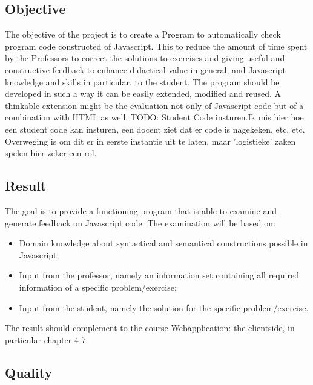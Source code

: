 \documentclass{article}
\begin{document}
\subsection{Objective}

The objective of the project is to create a Program to automatically check
program code constructed of Javascript. This to reduce the amount of time spent
by the Professors to correct the solutions to exercises and giving useful and
constructive feedback to enhance didactical value in general, and Javascript
knowledge and skills in particular, to the student. The program should be
developed in such a way it can be easily extended, modified and reused. A
thinkable extension might be the evaluation not only of Javascript code but of
a combination with HTML as well.
TODO: Student Code insturen.Ik mis hier hoe een student code kan insturen, een docent ziet dat er code is nagekeken, etc, etc. Overweging is om dit er in eerste instantie uit te laten, maar 'logistieke' zaken spelen hier zeker een rol.

\subsection{Result}

The goal is to provide a functioning program that is able to examine and
generate feedback on Javascript code. The examination will be based on:

\begin{itemize}
  \item Domain knowledge about syntactical and semantical constructions
    possible in Javascript;
  \item Input from the professor, namely an information set containing all
    required information of a specific problem/exercise;
  \item Input from the student, namely the solution for the specific
    problem/exercise.
\end{itemize}
The result should complement to the course Webapplication: the clientside, in particular chapter 4-7.


\subsection{Quality}
\end{document}
